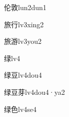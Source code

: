 \begin{verbete*}[6;12]{伦敦}{lun2dun1}
\end{verbete*}

\begin{verbete}[10;6]{旅行}{lv3xing2}
\end{verbete}

\begin{verbete}[10;12]{旅游}{lv3you2}
\end{verbete}

\begin{verbete}[11]{绿}{lv4}
\end{verbete}

\begin{verbete}[11;7]{绿豆}{lv4dou4}
\end{verbete}

\begin{verbete}[11;7;7]{绿豆芽}{lv4dou4·ya2}
\end{verbete}

\begin{verbete}[11;6]{绿色}{lv4se4}
\end{verbete}


